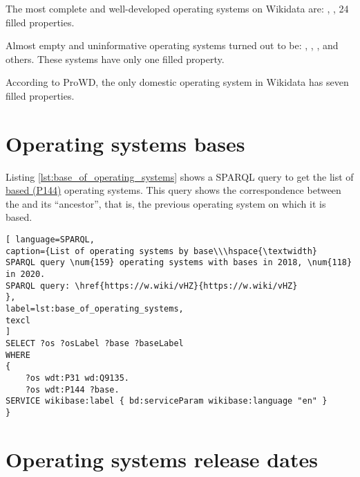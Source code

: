 The most complete and well-developed operating systems on Wikidata are:  , ,  24 filled properties\cite{prowd_os_link}.

Almost empty and uninformative operating systems turned out to be: , , , and others. These systems have only one filled property\cite{prowd_os_link}.

According to ProWD, the only domestic operating system in Wikidata  has seven filled properties\cite{prowd_os_link_ru}.

\section{Operating systems bases}
Listing \ref{lst:base_of_operating_systems} shows a SPARQL query to get the list of \href{https://www.wikidata.org/wiki/Property_talk:P144}{based (P144)} operating systems. This query shows the correspondence between the  and its ``ancestor'', that is, the previous operating system on which it is based.


\begin{lstlisting}[ language=SPARQL, 
caption={List of operating systems by base\\\hspace{\textwidth}
SPARQL query \num{159} operating systems with bases in 2018, \num{118} in 2020.
SPARQL query: \href{https://w.wiki/vHZ}{https://w.wiki/vHZ}
},
label=lst:base_of_operating_systems,
texcl 
]
SELECT ?os ?osLabel ?base ?baseLabel
WHERE
{
	?os wdt:P31 wd:Q9135.
	?os wdt:P144 ?base.
SERVICE wikibase:label { bd:serviceParam wikibase:language "en" }
}
\end{lstlisting}

\section{Operating systems release dates}

